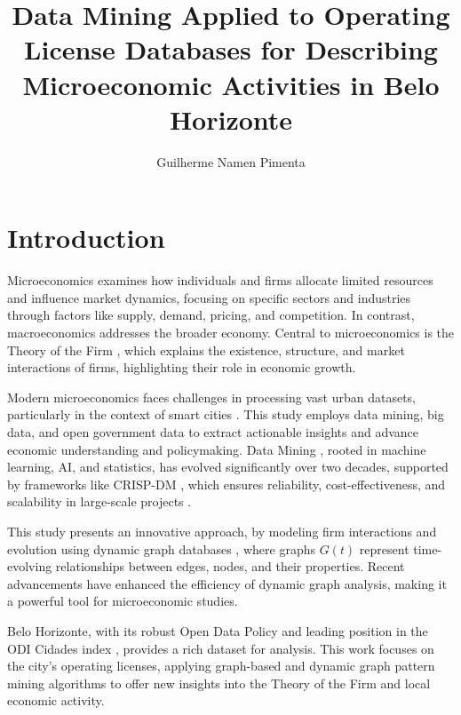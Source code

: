 \documentclass[12pt]{article}
\title{Data Mining Applied to Operating License Databases for Describing Microeconomic Activities in Belo Horizonte }
\author{Guilherme Namen Pimenta\inst{1} }
\begin{document}
 

\maketitle

\begin{abstract}
  
\end{abstract}
     
\begin{resumo} 

\end{resumo}


\section{Introduction}

Microeconomics examines how individuals and firms allocate limited resources and influence market dynamics, focusing on specific sectors and industries through factors like supply, demand, pricing, and competition. In contrast, macroeconomics addresses the broader economy. Central to microeconomics is the Theory of the Firm \cite{holmstrom1989theory}, which explains the existence, structure, and market interactions of firms, highlighting their role in economic growth.

Modern microeconomics faces challenges in processing vast urban datasets, particularly in the context of smart cities \cite{yin2015literature}. This study employs data mining, big data, and open government data to extract actionable insights and advance economic understanding and policymaking. Data Mining \cite{zaki2020data}, rooted in machine learning, AI, and statistics, has evolved significantly over two decades, supported by frameworks like CRISP-DM \cite{wirth2000crisp}, which ensures reliability, cost-effectiveness, and scalability in large-scale projects \cite{schroer2021systematic}.

This study presents an innovative approach, by modeling firm interactions and evolution using dynamic graph databases \cite{harary1997dynamic}, where graphs $G(t)$ represent time-evolving relationships between edges, nodes, and their properties. Recent advancements \cite{fournier2020survey, fournier2019mining} have enhanced the efficiency of dynamic graph analysis, making it a powerful tool for microeconomic studies.

Belo Horizonte, with its robust Open Data Policy and leading position in the ODI Cidades index \cite{odi}, provides a rich dataset for analysis. This work focuses on the city’s operating licenses, applying graph-based and dynamic graph pattern mining algorithms to offer new insights into the Theory of the Firm and local economic activity.
\end{document}
